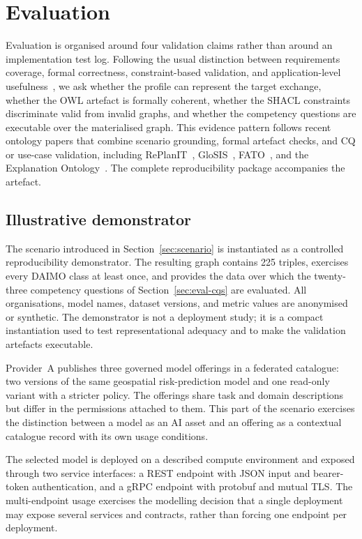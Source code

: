 \documentclass[11pt,a4paper]{article}
\begin{document}
\section{Evaluation}\label{sec:eval}

Evaluation is organised around four validation claims rather than around an implementation test log. Following the usual distinction between requirements coverage, formal correctness, constraint-based validation, and application-level usefulness~\cite{brank05}, we ask whether the profile can represent the target exchange, whether the OWL artefact is formally coherent, whether the SHACL constraints discriminate valid from invalid graphs, and whether the competency questions are executable over the materialised graph. This evidence pattern follows recent ontology papers that combine scenario grounding, formal artefact checks, and CQ or use-case validation, including RePlanIT~\cite{kurteva}, GloSIS~\cite{palma}, FATO~\cite{fato}, and the Explanation Ontology~\cite{explanation-ontology}. The complete reproducibility package accompanies the artefact.

\subsection{Illustrative demonstrator}\label{sec:eval-usecase}

The scenario introduced in Section~\ref{sec:scenario} is instantiated as a controlled reproducibility demonstrator. The resulting graph contains 225 triples, exercises every DAIMO class at least once, and provides the data over which the twenty-three competency questions of Section~\ref{sec:eval-cqs} are evaluated. All organisations, model names, dataset versions, and metric values are anonymised or synthetic. The demonstrator is not a deployment study; it is a compact instantiation used to test representational adequacy and to make the validation artefacts executable.

Provider~A publishes three governed model offerings in a federated catalogue: two versions of the same geospatial risk-prediction model and one read-only variant with a stricter policy. The offerings share task and domain descriptions but differ in the permissions attached to them. This part of the scenario exercises the distinction between a model as an AI asset and an offering as a contextual catalogue record with its own usage conditions.

The selected model is deployed on a described compute environment and exposed through two service interfaces: a REST endpoint with JSON input and bearer-token authentication, and a gRPC endpoint with protobuf and mutual TLS. The multi-endpoint usage exercises the modelling decision that a single deployment may expose several services and contracts, rather than forcing one endpoint per deployment.
\end{document}
